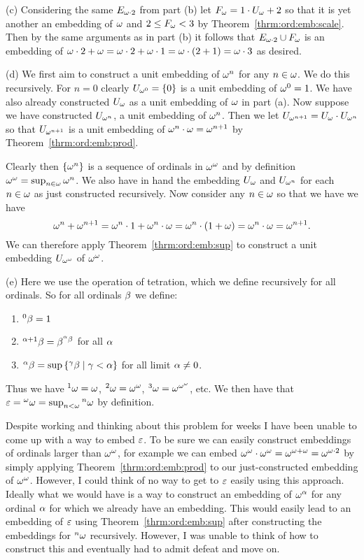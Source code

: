 {  (c) Considering the same $E_{\omega \cdot 2}$ from part (b) let $F_\omega = 1 \cdot U_\omega + 2$ so that it is yet another an embedding of $\omega$ and $2 \leq F_\omega < 3$ by Theorem~\ref{thrm:ord:emb:scale}.
  Then by the same arguments as in part (b) it follows that $E_{\omega \cdot 2} \cup F_\omega$ is an embedding of $\omega \cdot 2 + \omega = \omega \cdot 2 + \omega \cdot 1 = \omega \cdot (2 + 1) = \omega \cdot 3$ as desired.

  \def\Uww{U_{\w^\w}}

  (d) We first aim to construct a unit embedding of $\omega^n$ for any $n \in \omega$.
  We do this recursively.
  For $n=0$ clearly $U_{\omega^0} = \left\{ 0 \right\}$ is a unit embedding of $\omega^0 = 1$.
  We have also already constructed $U_\omega$ as a unit embedding of $\omega$ in part (a).
  Now suppose we have constructed $U_{\omega^n}$, a unit embedding of $\omega^n$.
  Then we let $U_{\omega^{n+1}} = U_\omega \cdot U_{\omega^n}$ so that $U_{\omega^{n+1}}$ is a unit embedding of $\omega^n \cdot \omega = \omega^{n+1}$ by Theorem~\ref{thrm:ord:emb:prod}.

  Clearly then $\left\{ \omega^n \right\}$ is a sequence of ordinals in $\omega^\omega$ and by definition $\omega^\omega = \sup_{n \in \omega} \omega^n$.
  We also have in hand the embedding $U_\omega$ and $U_{\omega^n}$ for each $n \in \omega$ as just constructed recursively.
  Now consider any $n \in \omega$ so that we have we have
  $$
    \omega^n + \omega^{n+1} = \omega^n \cdot 1 + \omega^n \cdot \omega = \omega^n \cdot (1 + \omega) = \omega^n \cdot \omega = \omega^{n+1}.
  $$
  We can therefore apply Theorem~\ref{thrm:ord:emb:sup} to construct a unit embedding $U_{\omega^\omega}$ of $\omega^\omega$.

  (e) Here we use the operation of tetration, which we define recursively for all ordinals.
  So for all ordinals $\beta$ we define:
  \begin{enumerate}
    \item ${^{0}\beta} = 1$
    \item ${^{\alpha+1}\beta} = \beta^{{^{\alpha}\beta}}$ for all $\alpha$
    \item ${^{\alpha}\beta} = \sup\left\{ {^{\gamma}\beta} \mid \gamma < \alpha \right\}$ for all limit $\alpha \neq 0$.
  \end{enumerate}
  Thus we have ${^{1}\omega} = \omega$, ${^{2}\omega} = \omega^\omega$, ${^{3}\omega} = \omega^{\omega^\omega}$, etc.
  We then have that $\varepsilon = {^{\omega}\omega} = \sup_{n < \omega} {^{n}\omega}$ by definition.

  Despite working and thinking about this problem for weeks I have been unable to come up with a way to embed $\varepsilon$.
  To be sure we can easily construct embeddings of ordinals larger than $\omega^\omega$, for example we can embed $\omega^\omega \cdot \omega^\omega = \omega^{\omega + \omega} = \omega^{\omega \cdot 2}$ by simply applying Theorem~\ref{thrm:ord:emb:prod} to our just-constructed embedding of $\omega^\omega$.
  However, I could think of no way to get to $\varepsilon$ easily using this approach.
  Ideally what we would have is a way to construct an embedding of $\omega^\alpha$ for any ordinal $\alpha$ for which we already have an embedding.
  This would easily lead to an embedding of $\varepsilon$ using Theorem~\ref{thrm:ord:emb:sup} after constructing the embeddings for ${^{n}\omega}$ recursively.
  However, I was unable to think of how to construct this and eventually had to admit defeat and move on.
}

